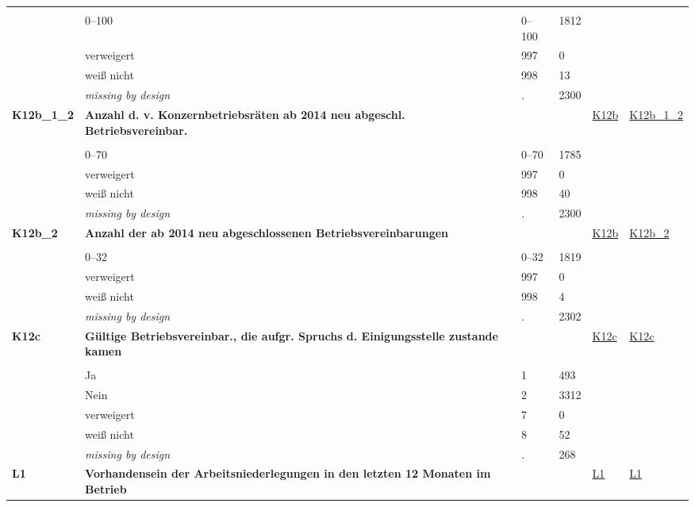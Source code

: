 \begin{longtable}{| L{2.45cm} | L{6cm} | C{1.5cm} | R{1cm} | C{2.25cm} | C{2.25cm} |}
   &  &  &  &  &  \\ 
   & 0--100 & 0--100 & 1812 &  &  \\ 
   & verweigert & 997 & 0 &  &  \\ 
   & weiß nicht & 998 & 13 &  &  \\ 
   & \textit{missing by design} & \textit{.} & 2300 &  &  \\ 
   \midrule
\textbf{K12b\_1\_2}\label{var:K12b:1:2} & \textbf{Anzahl d. v. Konzernbetriebsräten ab 2014 neu abgeschl. Betriebsvereinbar.} &  &  & \hyperref[K12b]{K12b} & \hyperref[var:suf:K12b:1:2]{K12b\_1\_2} \\ 
   &  &  &  &  &  \\ 
   & 0--70 & 0--70 & 1785 &  &  \\ 
   & verweigert & 997 & 0 &  &  \\ 
   & weiß nicht & 998 & 40 &  &  \\ 
   & \textit{missing by design} & \textit{.} & 2300 &  &  \\ 
   \midrule
\textbf{K12b\_2}\label{var:K12b:2} & \textbf{Anzahl der ab 2014 neu abgeschlossenen Betriebsvereinbarungen} &  &  & \hyperref[K12b]{K12b} & \hyperref[var:suf:K12b:2]{K12b\_2} \\ 
   &  &  &  &  &  \\ 
   & 0--32 & 0--32 & 1819 &  &  \\ 
   & verweigert & 997 & 0 &  &  \\ 
   & weiß nicht & 998 & 4 &  &  \\ 
   & \textit{missing by design} & \textit{.} & 2302 &  &  \\ 
   \midrule
\textbf{K12c}\label{var:K12c} & \textbf{Gültige Betriebsvereinbar., die aufgr. Spruchs d. Einigungsstelle zustande kamen} &  &  & \hyperref[K12c]{K12c} & \hyperref[var:suf:K12c]{K12c} \\ 
   &  &  &  &  &  \\ 
   & Ja & 1 & 493 &  &  \\ 
   & Nein & 2 & 3312 &  &  \\ 
   & verweigert & 7 & 0 &  &  \\ 
   & weiß nicht & 8 & 52 &  &  \\ 
   & \textit{missing by design} & \textit{.} & 268 &  &  \\ 
   \midrule
\textbf{L1}\label{var:L1} & \textbf{Vorhandensein der Arbeitsniederlegungen in den letzten 12 Monaten im Betrieb} &  &  & \hyperref[L1]{L1} & \hyperref[var:suf:L1]{L1} \\ 

\end{longtable}
